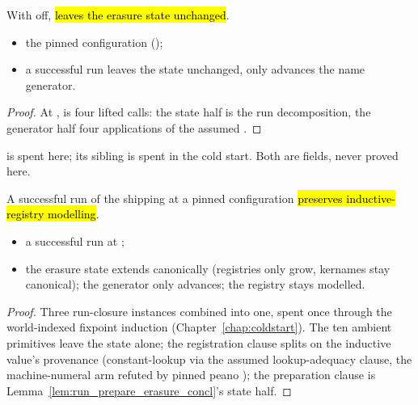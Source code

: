 \begin{lemma}
\label{lem:run_prepare_erasure_concl}
\leanok
{}
 With  off,  \hl{leaves the erasure state
unchanged}.
\begin{itemize}
\item {} the pinned configuration ();
\item {} a successful run leaves the state unchanged, only advances the name generator.
\end{itemize}
\end{lemma}
\begin{proof}
\leanok
{}
 At ,  is four lifted  calls: the state
half is the run decomposition, the generator half four applications of the assumed
.
\end{proof}

\begin{remark}
  is spent here; its sibling  is spent
in the cold start. Both are \stAssumed{} fields, never proved here.
\end{remark}

\begin{lemma}
\label{lem:visitExpr_runConcl}
\leanok
{}
 A successful run of the shipping  at a pinned configuration \hl{preserves
inductive-registry modelling}.
\begin{itemize}
\item {} a successful run at ;
\item {} the erasure state extends canonically (registries only grow, kernames stay canonical);
the generator only advances; the registry stays modelled.
\end{itemize}
\end{lemma}
\begin{proof}
\leanok
{}
 Three run-closure instances combined into one, spent once through the world-indexed fixpoint
induction (Chapter~\ref{chap:coldstart}). The ten ambient primitives leave the state alone; the
registration clause splits on the inductive value's provenance (constant-lookup via the assumed
lookup-adequacy clause, the machine-numeral arm refuted by pinned peano ); the preparation
clause is Lemma~\ref{lem:run_prepare_erasure_concl}'s state half.
\end{proof}

